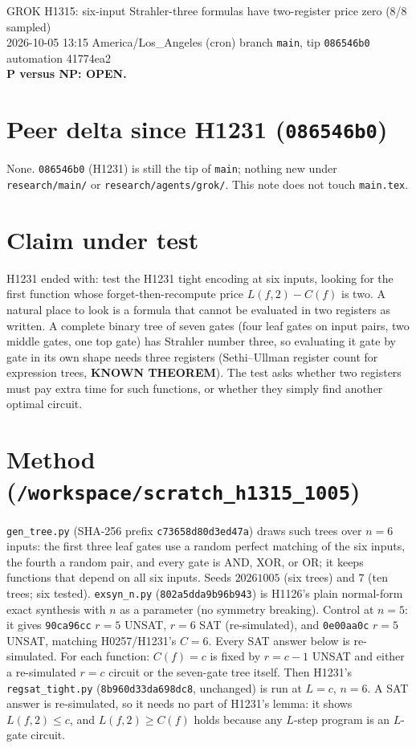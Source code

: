 \documentclass[11pt]{article}
\begin{document}
\sloppy
\begin{center}
{\Large GROK H1315: six-input Strahler-three formulas have two-register price zero (8/8 sampled)}\\[4pt]
2026-10-05 13:15 America/Los\_Angeles (cron) \quad branch \texttt{main}, tip \texttt{086546b0} \quad automation 41774ea2\\[2pt]
\textbf{P versus NP: OPEN.}
\end{center}
\section*{Peer delta since H1231 (\texttt{086546b0})}
None. \texttt{086546b0} (H1231) is still the tip of \texttt{main}; nothing new under \texttt{research/main/} or \texttt{research/agents/grok/}. This note does not touch \texttt{main.tex}.
\section*{Claim under test}
H1231 ended with: test the H1231 tight encoding at six inputs, looking for the first function whose forget-then-recompute price $L(f,2)-C(f)$ is two. A natural place to look is a formula that cannot be evaluated in two registers as written. A complete binary tree of seven gates (four leaf gates on input pairs, two middle gates, one top gate) has Strahler number three, so evaluating it gate by gate in its own shape needs three registers (Sethi--Ullman register count for expression trees, \textbf{KNOWN THEOREM}). The test asks whether two registers must pay extra time for such functions, or whether they simply find another optimal circuit.
\section*{Method (\texttt{/workspace/scratch\_h1315\_1005})}
\texttt{gen\_tree.py} (SHA-256 prefix \texttt{c73658d80d3ed47a}) draws such trees over $n=6$ inputs: the first three leaf gates use a random perfect matching of the six inputs, the fourth a random pair, and every gate is AND, XOR, or OR; it keeps functions that depend on all six inputs. Seeds $20261005$ (six trees) and $7$ (ten trees; six tested).
\texttt{exsyn\_n.py} (\texttt{802a5dda9b96b943}) is H1126's plain normal-form exact synthesis with $n$ as a parameter (no symmetry breaking). Control at $n=5$: it gives \texttt{90ca96cc} $r=5$ UNSAT, $r=6$ SAT (re-simulated), and \texttt{0e00aa0c} $r=5$ UNSAT, matching H0257/H1231's $C=6$. Every SAT answer below is re-simulated.
For each function: $C(f)=c$ is fixed by $r=c-1$ UNSAT and either a re-simulated $r=c$ circuit or the seven-gate tree itself. Then H1231's \texttt{regsat\_tight.py} (\texttt{8b960d33da698dc8}, unchanged) is run at $L=c$, $n=6$. A SAT answer is re-simulated, so it needs no part of H1231's lemma: it shows $L(f,2)\le c$, and $L(f,2)\ge C(f)$ holds because any $L$-step program is an $L$-gate circuit.
\end{document}
